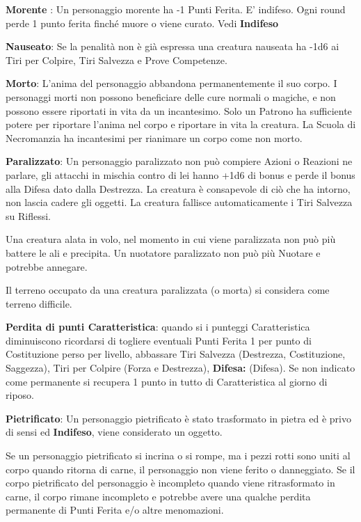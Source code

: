 \begin{multicols}{2}
\textbf{Morente} : Un personaggio morente ha -1 Punti Ferita. E' indifeso. Ogni round perde 1 punto ferita finché muore o viene curato. Vedi \textbf{Indifeso}

\textbf{Nauseato}: Se la penalità non è già espressa una creatura nauseata ha -1d6 ai Tiri per Colpire, Tiri Salvezza e Prove Competenze.

\textbf{Morto}:\hypertarget{morto}{} L'anima del personaggio abbandona permanentemente il suo corpo. I personaggi morti non possono beneficiare delle cure normali o magiche, e non possono essere riportati in vita da un incantesimo. Solo un Patrono ha sufficiente potere per riportare l'anima nel corpo e riportare in vita la creatura. La Scuola di Necromanzia ha incantesimi per rianimare un corpo come non morto.

\textbf{Paralizzato}:  Un personaggio paralizzato non può compiere Azioni o Reazioni ne parlare, gli attacchi in mischia contro di lei hanno +1d6 di bonus e perde il bonus alla Difesa dato dalla Destrezza. La creatura è consapevole di ciò che ha intorno, non lascia cadere gli oggetti. La creatura fallisce automaticamente i Tiri Salvezza su Riflessi. 

Una creatura alata in volo, nel momento in cui viene paralizzata non può più battere le ali e precipita. Un nuotatore paralizzato non può più Nuotare e potrebbe annegare.

Il terreno occupato da una creatura paralizzata (o morta) si considera come terreno difficile.

\textbf{Perdita di punti Caratteristica}: quando si i punteggi Caratteristica diminuiscono ricordarsi di togliere eventuali Punti Ferita 1 per punto di Costituzione perso per livello, abbassare Tiri Salvezza (Destrezza, Costituzione, Saggezza), Tiri per Colpire (Forza e Destrezza), \textbf{Difesa:} (Difesa). Se non indicato come permanente si recupera 1 punto in tutto di Caratteristica al giorno di riposo.

\textbf{Pietrificato}: Un personaggio pietrificato è stato trasformato in pietra ed è privo di sensi ed \textbf{Indifeso}, viene considerato un oggetto.

Se un personaggio pietrificato si incrina o si rompe, ma i pezzi rotti sono uniti al corpo quando ritorna di carne, il personaggio non viene ferito o danneggiato. Se il corpo pietrificato del personaggio è incompleto quando viene ritrasformato in carne, il corpo rimane incompleto e potrebbe avere una qualche perdita permanente di Punti Ferita e/o altre menomazioni.


\end{multicols}
